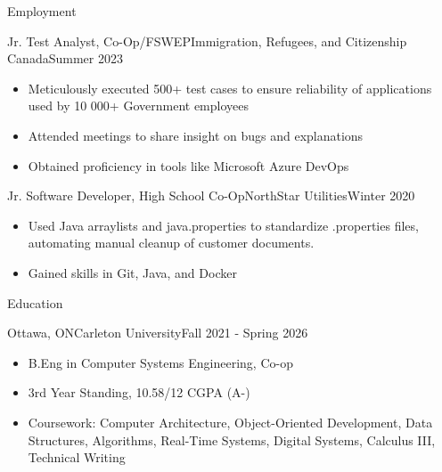 \documentclass[]{mcdowellcv}
\begin{document}
	\begin{cvsection}{Employment}
		

		\begin{cvsubsection}{Jr. Test Analyst, Co-Op/FSWEP}{Immigration, Refugees, and Citizenship Canada}{Summer 2023}			
			\begin{itemize}
				\item Meticulously executed 500+ test cases to ensure reliability of applications used by 10 000+ Government employees
				\item Attended meetings to share insight on bugs and explanations 
				\item Obtained proficiency in tools like Microsoft Azure DevOps 
			\end{itemize}
		\end{cvsubsection}
		
			\begin{cvsubsection}{Jr. Software Developer, High School Co-Op}{NorthStar Utilities}{Winter 2020}	
			\begin{itemize}
				\item Used Java arraylists and java.properties to standardize .properties files, automating manual cleanup of customer documents.
				\item Gained skills in Git, Java, and Docker
			\end{itemize}
		\end{cvsubsection}
	\end{cvsection}

	\begin{cvsection}{Education}
		\begin{cvsubsection}{Ottawa, ON}{Carleton University}{Fall 2021 - Spring 2026}
			\begin{itemize}
				\item B.Eng in Computer Systems Engineering, Co-op
				\item 3rd Year Standing, 10.58/12 CGPA (A-)
				\item Coursework: Computer Architecture, Object-Oriented Development, Data Structures, Algorithms, Real-Time Systems, Digital Systems, Calculus III, Technical Writing
			\end{itemize}
		\end{cvsubsection}
	\end{cvsection}
	
\end{document}
